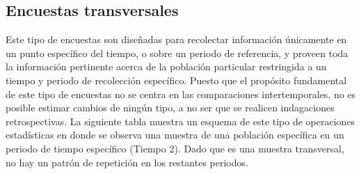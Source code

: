 \documentclass[
  12pt,
]{book}
\begin{document}
\hypertarget{encuestas-transversales}{%
\subsection{Encuestas transversales}\label{encuestas-transversales}}

Este tipo de encuestas son diseñadas para recolectar información únicamente en un punto específico del tiempo, o sobre un periodo de referencia, y proveen toda la información pertinente acerca de la población particular restringida a un tiempo y periodo de recolección específico. Puesto que el propósito fundamental de este tipo de encuestas no se centra en las comparaciones intertemporales, no es posible estimar cambios de ningún tipo, a no ser que se realicen indagaciones retrospectivas. La siguiente tabla muestra un esquema de este tipo de operaciones estadísticas en donde se observa una muestra de una población específica en un periodo de tiempo específico (Tiempo 2). Dado que es una muestra transversal, no hay un patrón de repetición en los restantes periodos.
\end{document}
